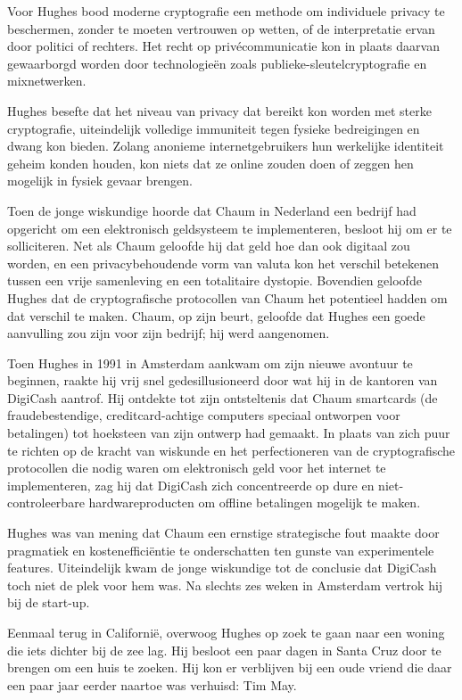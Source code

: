 \documentclass[
  a5paper,
  smalldemyvopaper,11pt,twoside,onecolumn,openright,extrafontsizes,
hidelinks]{memoir}
\begin{document}
Voor Hughes bood moderne cryptografie een methode om individuele privacy
te beschermen, zonder te moeten vertrouwen op wetten, of de
interpretatie ervan door politici of rechters. Het recht op
privécommunicatie kon in plaats daarvan gewaarborgd worden door
technologieën zoals publieke-sleutelcryptografie en mixnetwerken.

Hughes besefte dat het niveau van privacy dat bereikt kon worden met
sterke cryptografie, uiteindelijk volledige immuniteit tegen fysieke
bedreigingen en dwang kon bieden. Zolang anonieme internetgebruikers hun
werkelijke identiteit geheim konden houden, kon niets dat ze online
zouden doen of zeggen hen mogelijk in fysiek gevaar brengen.

Toen de jonge wiskundige hoorde dat Chaum in Nederland een bedrijf had
opgericht om een elektronisch geldsysteem te implementeren, besloot hij
om er te solliciteren. Net als Chaum geloofde hij dat geld hoe dan ook
digitaal zou worden, en een privacybehoudende vorm van valuta kon het
verschil betekenen tussen een vrije samenleving en een totalitaire
dystopie. Bovendien geloofde Hughes dat de cryptografische protocollen
van Chaum het potentieel hadden om dat verschil te maken. Chaum, op zijn
beurt, geloofde dat Hughes een goede aanvulling zou zijn voor zijn
bedrijf; hij werd aangenomen.

Toen Hughes in 1991 in Amsterdam aankwam om zijn nieuwe avontuur te
beginnen, raakte hij vrij snel gedesillusioneerd door wat hij in de
kantoren van DigiCash aantrof. Hij ontdekte tot zijn ontsteltenis dat
Chaum smartcards (de fraudebestendige, creditcard-achtige computers
speciaal ontworpen voor betalingen) tot hoeksteen van zijn ontwerp had
gemaakt. In plaats van zich puur te richten op de kracht van wiskunde en
het perfectioneren van de cryptografische protocollen die nodig waren om
elektronisch geld voor het internet te implementeren, zag hij dat
DigiCash zich concentreerde op dure en niet-controleerbare
hardwareproducten om offline betalingen mogelijk te maken.

Hughes was van mening dat Chaum een ernstige strategische fout maakte
door pragmatiek en kostenefficiëntie te onderschatten ten gunste van
experimentele features. Uiteindelijk kwam de jonge wiskundige tot de
conclusie dat DigiCash toch niet de plek voor hem was. Na slechts zes
weken in Amsterdam vertrok hij bij de start-up.

Eenmaal terug in Californië, overwoog Hughes op zoek te gaan naar een
woning die iets dichter bij de zee lag. Hij besloot een paar dagen in
Santa Cruz door te brengen om een huis te zoeken. Hij kon er verblijven
bij een oude vriend die daar een paar jaar eerder naartoe was verhuisd:
Tim May.
\end{document}
